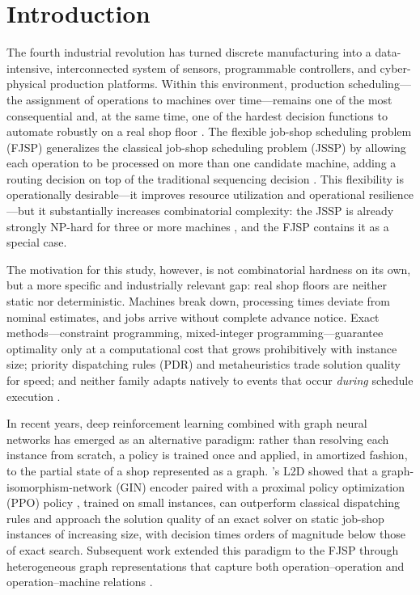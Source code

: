 \documentclass[11pt]{article}
\begin{document}
\newpage
\setcounter{page}{1}

\section{Introduction}

The fourth industrial revolution has turned discrete manufacturing into a data-intensive, interconnected system of sensors, programmable controllers, and cyber-physical production platforms. Within this environment, production scheduling---the assignment of operations to machines over time---remains one of the most consequential and, at the same time, one of the hardest decision functions to automate robustly on a real shop floor \citep{pinedo2022}. The flexible job-shop scheduling problem (FJSP) generalizes the classical job-shop scheduling problem (JSSP) by allowing each operation to be processed on more than one candidate machine, adding a routing decision on top of the traditional sequencing decision \citep{brandimarte1993}. This flexibility is operationally desirable---it improves resource utilization and operational resilience---but it substantially increases combinatorial complexity: the JSSP is already strongly NP-hard for three or more machines \citep{garey1976}, and the FJSP contains it as a special case.

The motivation for this study, however, is not combinatorial hardness on its own, but a more specific and industrially relevant gap: real shop floors are neither static nor deterministic. Machines break down, processing times deviate from nominal estimates, and jobs arrive without complete advance notice. Exact methods---constraint programming, mixed-integer programming---guarantee optimality only at a computational cost that grows prohibitively with instance size; priority dispatching rules (PDR) and metaheuristics trade solution quality for speed; and neither family adapts natively to events that occur \emph{during} schedule execution \citep{pinedo2022,graham1979}.

In recent years, deep reinforcement learning \citep{sutton2018} combined with graph neural networks has emerged as an alternative paradigm: rather than resolving each instance from scratch, a policy is trained once and applied, in amortized fashion, to the partial state of a shop represented as a graph. \citet{zhang2020l2d}'s L2D showed that a graph-isomorphism-network (GIN) encoder paired with a proximal policy optimization (PPO) policy \citep{schulman2017ppo}, trained on small instances, can outperform classical dispatching rules and approach the solution quality of an exact solver on static job-shop instances of increasing size, with decision times orders of magnitude below those of exact search. Subsequent work extended this paradigm to the FJSP through heterogeneous graph representations that capture both operation--operation and operation--machine relations \citep{song2023,lei2022}.
\end{document}
